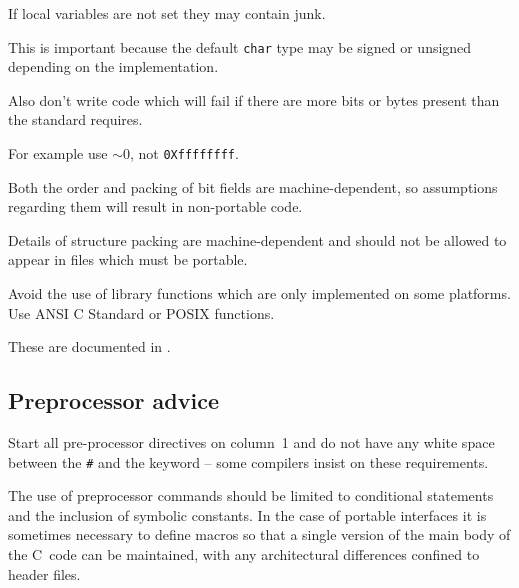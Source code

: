 If local variables are not set they may contain junk.

This is important because 
the default {\tt char} type may be signed 
or unsigned depending on the implementation.


Also don't write code which will fail if there are more bits or bytes present 
than the standard requires.


For example use {\tt$\sim0$}, not {\tt 0Xffffffff}.


Both the order and packing of bit fields are machine-dependent, so 
assumptions regarding them will result in non-portable code.

Details of structure packing are machine-dependent and should not be allowed 
to appear in files which must be portable.

Avoid the use of library functions which are only implemented 
on some platforms. Use ANSI C Standard or POSIX functions.

These are documented in .

\subsection{Preprocessor advice}


Start all pre-processor directives on column~1 and do not have any white
space between the {\tt \#} and the keyword -- some compilers insist on 
these requirements.

The use of preprocessor commands should be limited to conditional 
statements and the inclusion of symbolic constants.
In the case of portable interfaces it is sometimes necessary to define
macros so that a single version of the main body of the C~code can be 
maintained,
with any architectural differences confined to header files.

